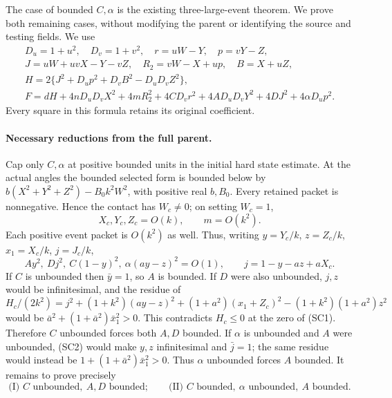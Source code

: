 The case of bounded $C,\alpha$ is the existing three-large-event
theorem. We prove both remaining cases, without modifying the parent
or identifying the source and testing fields. We use
\[
\begin{gathered}
 D_u=1+u^2,\quad D_v=1+v^2,\quad r=uW-Y,\quad p=vY-Z,\\
 J=uW+uvX-Y-vZ,\quad R_2=vW-X+up,\quad B=X+uZ,\\
 H=2\{J^2+D_up^2+D_vB^2-D_uD_vZ^2\},\\
 F=dH+4nD_uD_vX^2+4mR_2^2+4CD_vr^2
       +4AD_uD_vY^2+4DJ^2+4\alpha D_up^2.              
\end{gathered}
\tag{SC1}
\]
Every square in this formula retains its original coefficient.

\paragraph{Necessary reductions from the full parent.}
Cap only $C,\alpha$ at positive bounded units in the initial hard
state estimate. At the actual angles the bounded selected form is
bounded below by
$b(X^2+Y^2+Z^2)-B_0k^2W^2$, with positive real $b,B_0$.
Every retained packet is nonnegative. Hence the contact has $W_c\ne0$;
on setting $W_c=1$,
\[
 X_c,Y_c,Z_c=O(k),\qquad m=O(k^2).
\]
Each positive event packet is $O(k^2)$ as well. Thus, writing
$y=Y_c/k$, $z=Z_c/k$, $x_1=X_c/k$, $j=J_c/k$,
\[
 Ay^2,\ Dj^2,\ C(1-y)^2,\ \alpha(ay-z)^2=O(1),\qquad
 j=1-y-az+aX_c.                                      \tag{SC2}
\]
If $C$ is unbounded then $\bar y=1$, so $A$ is bounded. If $D$
were also unbounded, $j,z$ would be infinitesimal, and the residue of
\[
 H_c/(2k^2)=j^2+(1+k^2)(ay-z)^2
            +(1+a^2)(x_1+Z_c)^2-(1+k^2)(1+a^2)z^2
\]
would be $\bar a^2+(1+\bar a^2)\bar x_1^2>0$.
This contradicts $H_c\leq0$ at the zero of (SC1). Therefore
$C$ unbounded forces both $A,D$ bounded. If $\alpha$ is unbounded
and $A$ were unbounded, (SC2) would make $y,z$ infinitesimal and
$\bar j=1$; the same residue would instead be
$1+(1+\bar a^2)\bar x_1^2>0$. Thus $\alpha$ unbounded forces $A$
bounded. It remains to prove precisely
\[
 \text{(I) } C\text{ unbounded},\ A,D\text{ bounded};\qquad
 \text{(II) } C\text{ bounded},\ \alpha\text{ unbounded},\ A\text{ bounded}.
                                                               \tag{SC3}
\]

